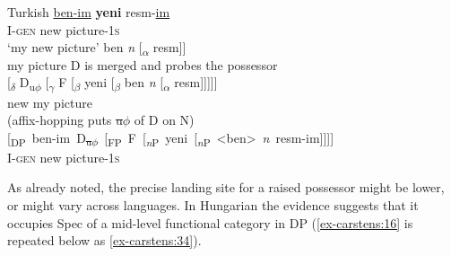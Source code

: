 \documentclass[output=paper
,modfonts
,nonflat]{langsci/langscibook}
\begin{document}
\begin{exe} \settowidth{}
	\ex Turkish \label{ex-carstens:33}
	\xlist
	\ex 
	\gll\uline{ben}\uline{-im}   \textbf{yeni}  resm-\uline{im} \\
	I-\textsc{gen}  new   picture-1\textsc{s}\\
	\glt `my new picture'  	
	\ex {[\textsubscript{$\beta$}} ben \textit{n} [\textsubscript{$\alpha$} resm]]\\
	\hspace{0.5cm}my	\hspace{0.8cm}picture
	\ex D is merged and probes the possessor\\
	{[\textsubscript{$\delta$}} D\textsubscript{u}\textsubscript{$\phi$} [\textsubscript{$\gamma$} F [\textsubscript{$\beta$} yeni {[\textsubscript{${\beta}$}} ben \textit{n} [\textsubscript{$\alpha$} resm]]]]]\\
	\hspace{2.3cm}new  \hspace{.4cm}my \hspace{.8cm}picture\\
	\ex\label{ex-carstens:33d} (affix-hopping puts \sout{u$\phi$} of D on N)\\
	\mbox{[\textsubscript{DP} ben-im D\textsubscript{\sout{u$\phi$}} [\textsubscript{FP} F [\textsubscript{\textit{n}P} yeni [\textsubscript{\textit{n}P} <ben> \textit{n} resm-im]]]]}\\ 
	\hspace{.59cm}I-\textsc{gen} \hspace{2.38cm}new  \hspace{1.95cm}picture-1\textsc{s}\\
	\endxlist
\end{exe}
As already noted, the precise landing site for a raised possessor might be lower, or might vary across languages. In Hungarian the evidence suggests that it occupies Spec of a mid-level functional category in DP (\ref{ex-carstens:16} is repeated below as \ref{ex-carstens:34}).\largerpage[-2]
\end{document}
